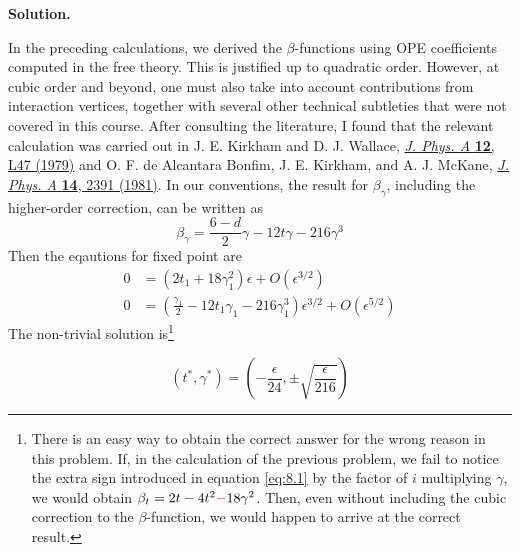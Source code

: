 \documentclass[11pt,a4paper]{article}
\newcounter{problem}
\newcounter{saveequation}
\newenvironment{solution}
{
	\par
	\setcounter{saveequation}{\value{equation}}
	\begingroup
	\setcounter{equation}{0}
	\renewcommand{\theequation}{\arabic{problem}.\arabic{equation}}
	\renewcommand{\theHequation}{sol.\arabic{problem}.\arabic{equation}}
	\noindent\textbf{Solution.}\quad
}
{
	\par
	\endgroup
	\setcounter{equation}{\value{saveequation}}
}
\begin{document}
\begin{solution}
		
		In the preceding calculations, we derived the $\beta$-functions using OPE coefficients computed in the free theory. This is justified up to quadratic order. However, at cubic order and beyond, one must also take into account contributions from interaction vertices, together with several other technical subtleties that were not covered in this course. After consulting the literature, I found that the relevant calculation was carried out in J. E. Kirkham and D. J. Wallace,
		\href{https://doi.org/10.1088/0305-4470/12/2/001}
		{\textit{J. Phys. A} \textbf{12}, L47 (1979)} and
		O. F. de Alcantara Bonfim, J. E. Kirkham, and A. J. McKane,
		\href{https://doi.org/10.1088/0305-4470/14/9/034}
		{\textit{J. Phys. A} \textbf{14}, 2391 (1981)}. In our conventions, the result for $\beta_\gamma$, including the higher-order correction, can be written as
		\begin{equation}
			\beta_\gamma=\frac{6-d}{2}\gamma-12t\gamma-216\gamma^3
		\end{equation}
		Then the eqautions for fixed point are
		\begin{equation}
			\begin{aligned}
			0&=(2t_1+18\gamma_1^2)\epsilon+O(\epsilon^{3/2})\\
			0&=\left(\frac{\gamma_1}{2}-12t_1\gamma_1-216\gamma_1^3\right){\epsilon}^{3/2}+O(\epsilon^{5/2})
			\end{aligned}
		\end{equation}
		The non-trivial solution is\footnote{There is an easy way to obtain the correct answer for the wrong reason in this problem. If, in the calculation of the previous problem, we fail to notice the extra sign introduced in equation \ref{eq:8.1} by the factor of $i$ multiplying $\gamma$, we would obtain $\beta_t=2t-4t^2\textcolor{red}{-}18\gamma^2$. Then, even without including the cubic correction to the $\beta$-function, we would happen to arrive at the correct result.
		}
		\begin{finalanswer}
			\begin{equation}
				\label{fin:9}
				(t^*,\gamma^*)=\left(-\frac{\epsilon}{24},\pm\sqrt{\frac{\epsilon}{216}}\right)
			\end{equation}
		\end{finalanswer}
	\end{solution}
\end{document}
